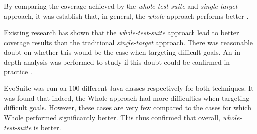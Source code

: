 By comparing the coverage achieved by the \textit{whole-test-suite} and \textit{single-target} approach, it was establish that, in general, the \textit{whole} approach performs better \cite{FRASER2014,FRASER2015}.

Existing research has shown that the \textit{whole-test-suite} approach lead to better coverage results than the traditional \textit{single-target} approach. 
There was reasonable doubt on whether this would be the case when targeting difficult goals. 
An in-depth analysis was performed to study if this doubt could be confirmed in practice \cite{FRASER2014}.

EvoSuite was run on 100 different Java classes respectively for both techniques. 
It was found that indeed, the Whole approach had more difficulties when targeting difficult goals. 
However, these cases are very few compared to the cases for which Whole performed significantly better.
This thus confirmed that overall, \textit{whole-test-suite} is better. 



